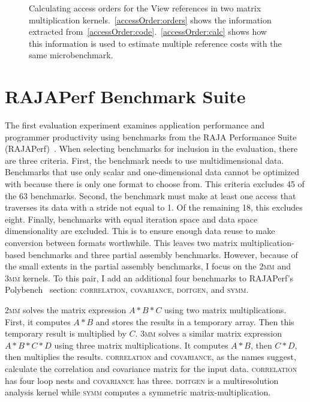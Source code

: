 \begin{figure*}
	
	\caption{Calculating access orders for the View references in two matrix multiplication kernels.~\ref{accessOrder:orders} shows the information extracted from~\ref{accessOrder:code}.~\ref{accessOrder:calc} shows how this information is used to estimate multiple reference costs with the same microbenchmark. }\label{accessOrder}

\end{figure*}



\section{RAJAPerf Benchmark Suite}\label{sec:Experiment1}

The first evaluation experiment examines application performance and programmer productivity using benchmarks from the RAJA Performance Suite (RAJAPerf)~\cite{hornung2017raja}. 
When selecting benchmarks for inclusion in the evaluation, there are three criteria.
First, the benchmark needs to use multidimensional data. 
Benchmarks that use only scalar and one-dimensional data cannot be optimized with \FormatDecisions{} because there is only one format to choose from.
This criteria excludes 45 of the 63 benchmarks.
Second, the benchmark must make at least one access that traverses its data with a stride not equal to 1. 
Of the remaining 18, this excludes eight.
Finally, benchmarks with equal iteration space and data space dimensionality are excluded. 
This is to ensure enough data reuse to make conversion between formats worthwhile.
This leaves two matrix multiplication-based benchmarks and three partial assembly benchmarks.
However, because of the small extents in the partial assembly benchmarks, I focus on the \textsc{2mm} and \textsc{3mm} kernels.
To this pair, I add an additional four benchmarks to RAJAPerf's Polybench~\cite{pouchet2012polybench} section: \textsc{correlation}, \textsc{covariance}, \textsc{doitgen}, and \textsc{symm}. 

\textsc{2mm} solves the matrix expression $A*B*C$ using two matrix multiplications. 
First, it computes $A*B$ and stores the results in a temporary array.
Then this temporary result is multiplied by $C$.
\textsc{3mm} solves a similar matrix expression $A*B*C*D$ using three matrix multiplications.
It computes $A*B$, then $C*D$, then multiplies the results.
\textsc{correlation} and \textsc{covariance}, as the names suggest, calculate the correlation and covariance matrix for the input data. 
\textsc{correlation} has four loop nests and \textsc{covariance} has three.
\textsc{doitgen} is a multiresolution analysis kernel while \textsc{symm} computes a symmetric matrix-multiplication.

